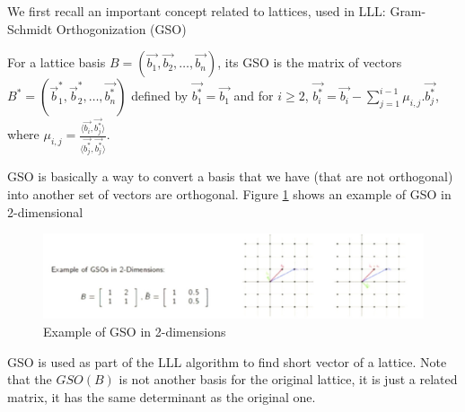 We first recall an important concept related to lattices, used in LLL:
Gram-Schmidt Orthogonization (GSO)
\begin{definition}
  [GSO] For a lattice basis
  $B = \left( \vec{b_1}, \vec{b_2}, \dots, \vec{b_n} \right)$, its GSO is the
  matrix of vectors
  $B^* = \left( \vec{b}_1^*, \vec{b}_2^*, \dots, \vec{b_n^*} \right)$ defined by
  $\vec{b_1^*} = \vec{b_1}$ and for $i \geq 2$,
  $\vec{b_i^*} = \vec{b_i} - \sum_{j=1}^{i-1}{\mu_{i,j}.\vec{b_j^*}}$, where
  $\mu_{i,j} = \frac{\langle \vec{b_i}, \vec{b_j^*} \rangle}{\langle
    \vec{b_j^*},\vec{b_j^*} \rangle}$.
  \label{def:GSO}
\end{definition}
GSO is basically a way to convert a basis that we have (that are not orthogonal)
into another set of vectors are orthogonal. Figure \ref{fig:gso} shows an
example of GSO in 2-dimensional
\begin{figure}[h]
  \centering \includegraphics[scale=0.3]{gso}
  \caption{Example of GSO in 2-dimensions}
  \label{fig:gso}
\end{figure}
GSO is used as part of the LLL algorithm to find short vector of a lattice.
Note that the $GSO(B)$ is not another basis for the original lattice, it is just
a related matrix, it has the same determinant as the original one.



